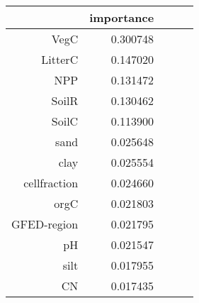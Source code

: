 \begin{tabular}{rrrrr}
\toprule
 & importance \\
\midrule
VegC & 0.300748 \\
LitterC & 0.147020 \\
NPP & 0.131472 \\
SoilR & 0.130462 \\
SoilC & 0.113900 \\
sand & 0.025648 \\
clay & 0.025554 \\
cellfraction & 0.024660 \\
orgC & 0.021803 \\
GFED-region & 0.021795 \\
pH & 0.021547 \\
silt & 0.017955 \\
CN & 0.017435 \\
\bottomrule
\end{tabular}
